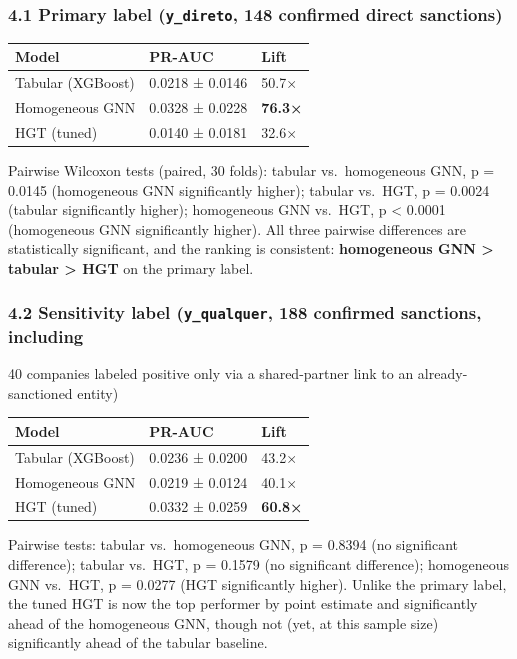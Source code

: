 \documentclass[11pt,]{article}
\begin{document}
\hypertarget{primary-label-y_direto-148-confirmed-direct-sanctions}{%
\subsubsection{\texorpdfstring{4.1 Primary label (\texttt{y\_direto},
148 confirmed direct
sanctions)}{4.1 Primary label (y\_direto, 148 confirmed direct sanctions)}}\label{primary-label-y_direto-148-confirmed-direct-sanctions}}

\begin{longtable}[]{@{}lll@{}}
\toprule
Model & PR-AUC & Lift\tabularnewline
\midrule
\endhead
Tabular (XGBoost) & 0.0218 ± 0.0146 & 50.7×\tabularnewline
Homogeneous GNN & 0.0328 ± 0.0228 & \textbf{76.3×}\tabularnewline
HGT (tuned) & 0.0140 ± 0.0181 & 32.6×\tabularnewline
\bottomrule
\end{longtable}

Pairwise Wilcoxon tests (paired, 30 folds): tabular vs.~homogeneous GNN,
p = 0.0145 (homogeneous GNN significantly higher); tabular vs.~HGT, p =
0.0024 (tabular significantly higher); homogeneous GNN vs.~HGT, p
\textless{} 0.0001 (homogeneous GNN significantly higher). All three
pairwise differences are statistically significant, and the ranking is
consistent: \textbf{homogeneous GNN \textgreater{} tabular
\textgreater{} HGT} on the primary label.

\hypertarget{sensitivity-label-y_qualquer-188-confirmed-sanctions-including}{%
\subsubsection{\texorpdfstring{4.2 Sensitivity label
(\texttt{y\_qualquer}, 188 confirmed sanctions,
including}{4.2 Sensitivity label (y\_qualquer, 188 confirmed sanctions, including}}\label{sensitivity-label-y_qualquer-188-confirmed-sanctions-including}}

40 companies labeled positive only via a shared-partner link to an
already-sanctioned entity)

\begin{longtable}[]{@{}lll@{}}
\toprule
Model & PR-AUC & Lift\tabularnewline
\midrule
\endhead
Tabular (XGBoost) & 0.0236 ± 0.0200 & 43.2×\tabularnewline
Homogeneous GNN & 0.0219 ± 0.0124 & 40.1×\tabularnewline
HGT (tuned) & 0.0332 ± 0.0259 & \textbf{60.8×}\tabularnewline
\bottomrule
\end{longtable}

Pairwise tests: tabular vs.~homogeneous GNN, p = 0.8394 (no significant
difference); tabular vs.~HGT, p = 0.1579 (no significant difference);
homogeneous GNN vs.~HGT, p = 0.0277 (HGT significantly higher). Unlike
the primary label, the tuned HGT is now the top performer by point
estimate and significantly ahead of the homogeneous GNN, though not
(yet, at this sample size) significantly ahead of the tabular baseline.
\end{document}
